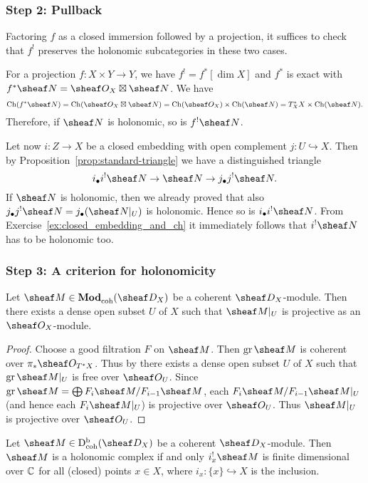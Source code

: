 \documentclass[number-in-sections,a4paper]{notes}
\begin{document}
\subsubsection*{Step 2: Pullback}

Factoring $f$ as a closed immersion followed by a projection, it suffices to check that $f^!$ preserves the holonomic subcategories in these two cases.

For a projection $f\colon X \times Y \to Y$, we have $f^! = f^*[\dim X]$ and $f^*$ is exact with $f^*\sheaf N = \sO_X \boxtimes \sheaf N$.
We have
\[
    \Ch(f^*\sheaf N) = \Ch(\sO_X \boxtimes \sheaf N) = \Ch(\sO_X) \times \Ch(\sheaf N) = T^*_XX \times \Ch(\sheaf N).
\]
Therefore, if $\sheaf N$ is holonomic, so is $f^!\sheaf N$.

Let now $i\colon Z \to X$ be a closed embedding with open complement $j\colon U \hookrightarrow X$.
Then by Proposition~\ref{prop:standard-triangle} we have a distinguished triangle
\[
    i_\bullet i^! \sheaf N \to \sheaf N \to j_\bullet j^!\sheaf N.
\]
If $\sheaf N$ is holonomic, then we already proved that also $j_\bullet j^!\sheaf N = j_\bullet(\res{\sheaf N}{U})$ is holonomic.
Hence so is $i_\bullet i^! \sheaf N$.
From Exercise~\ref{ex:closed_embedding_and_ch} it immediately follows that $i^!\sheaf N$ has to be holonomic too.

\subsubsection*{Step 3: A criterion for holonomicity}

\begin{Lemma}
    Let $\sheaf M \in \catDModcoh{X}$ be a coherent $\sD_X$-module.
    Then there exists a dense open subset $U$ of $X$ such that $\res{\sheaf M}{U}$ is projective as an $\sO_X$-module.
\end{Lemma}

\begin{proof}
    Choose a good filtration $F$ on $\sheaf M$.
    Then $\gr \sheaf M$ is coherent over $\pi_*\sO_{T^*X}$.
    Thus by \cite[Lemma~6.9.2]{EGA4.2} there exists a dense open subset $U$ of $X$ such that $\res{\gr \sheaf M}U$ is free over $\sO_U$.
    Since $\gr\sheaf M = \bigoplus F_i\sheaf M/F_{i-1}\sheaf M$, each $\res{F_i\sheaf M/F_{i-1}\sheaf M}U$ (and hence each $\res{F_i\sheaf M}U$) is projective over $\sO_U$.
    Thus $\res{\sheaf M}U$ is projective over $\sO_U$.
\end{proof}

\begin{Proposition}\label{prop:local_hol_criterion}
    Let $\sheaf M \in \catDbDModcoh{X}$ be a coherent $\sD_X$-module.
    Then $\sheaf M$ is a holonomic complex if and only $i_x^!\sheaf M$ is finite dimensional over ${\mathbb{C}}$ for all (closed) points $x \in X$, where $i_x\colon \{x\} \hookrightarrow X$ is the inclusion.
\end{Proposition}
\end{document}
